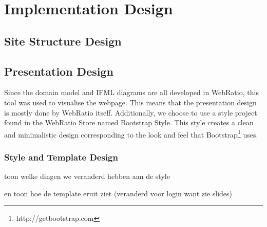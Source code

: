 \documentclass[a4paper]{report}
\begin{document}
\chapter{Implementation Design}
\section{Site Structure Design}

\section{Presentation Design}
Since the domain model and IFML diagrams are all developed in WebRatio, this tool was used to visualise the webpage.
This means that the presentation design is mostly done by WebRatio itself. Additionally, we choose to use a style project found in the WebRatio Store named Bootstrap Style. This style creates a clean and minimalistic design corresponding to the look and feel that Bootstrap\footnote{http://getbootstrap.com} uses.
 
\subsection{Style and Template Design}
toon welke dingen we veranderd hebben aan de style

en toon hoe de template eruit ziet
(veranderd voor login want zie slides)
\end{document}
